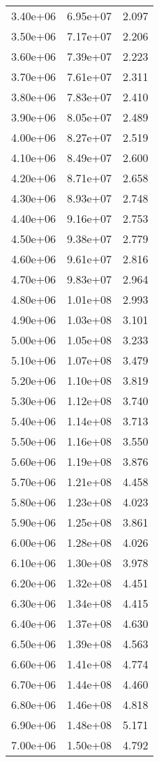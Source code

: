 \begin{table}
\begin{tabular}{lll}
3.40e+06 & 6.95e+07 & 2.097 \\
3.50e+06 & 7.17e+07 & 2.206 \\
3.60e+06 & 7.39e+07 & 2.223 \\
3.70e+06 & 7.61e+07 & 2.311 \\
3.80e+06 & 7.83e+07 & 2.410 \\
3.90e+06 & 8.05e+07 & 2.489 \\
4.00e+06 & 8.27e+07 & 2.519 \\
4.10e+06 & 8.49e+07 & 2.600 \\
4.20e+06 & 8.71e+07 & 2.658 \\
4.30e+06 & 8.93e+07 & 2.748 \\
4.40e+06 & 9.16e+07 & 2.753 \\
4.50e+06 & 9.38e+07 & 2.779 \\
4.60e+06 & 9.61e+07 & 2.816 \\
4.70e+06 & 9.83e+07 & 2.964 \\
4.80e+06 & 1.01e+08 & 2.993 \\
4.90e+06 & 1.03e+08 & 3.101 \\
5.00e+06 & 1.05e+08 & 3.233 \\
5.10e+06 & 1.07e+08 & 3.479 \\
5.20e+06 & 1.10e+08 & 3.819 \\
5.30e+06 & 1.12e+08 & 3.740 \\
5.40e+06 & 1.14e+08 & 3.713 \\
5.50e+06 & 1.16e+08 & 3.550 \\
5.60e+06 & 1.19e+08 & 3.876 \\
5.70e+06 & 1.21e+08 & 4.458 \\
5.80e+06 & 1.23e+08 & 4.023 \\
5.90e+06 & 1.25e+08 & 3.861 \\
6.00e+06 & 1.28e+08 & 4.026 \\
6.10e+06 & 1.30e+08 & 3.978 \\
6.20e+06 & 1.32e+08 & 4.451 \\
6.30e+06 & 1.34e+08 & 4.415 \\
6.40e+06 & 1.37e+08 & 4.630 \\
6.50e+06 & 1.39e+08 & 4.563 \\
6.60e+06 & 1.41e+08 & 4.774 \\
6.70e+06 & 1.44e+08 & 4.460 \\
6.80e+06 & 1.46e+08 & 4.818 \\
6.90e+06 & 1.48e+08 & 5.171 \\
7.00e+06 & 1.50e+08 & 4.792 \\

\end{tabular}
\end{table}

